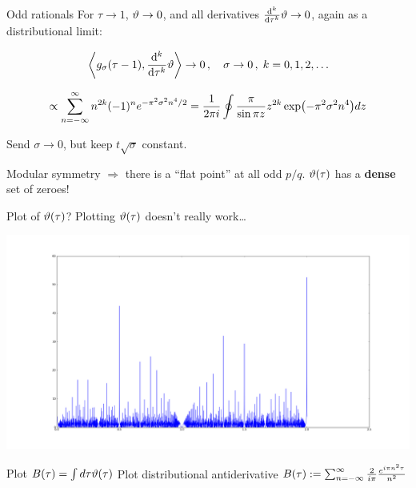 \documentclass{beamer}
\newcommand\inputpgf[2]{{
\let\pgfimageWithoutPath\pgfimage
\renewcommand{\pgfimage}[2][]{\pgfimageWithoutPath[##1]{#1/##2}}

}}
\begin{document}
\begin{frame}{Odd rationals}
    For $\tau \rightarrow 1$, $\vartheta \rightarrow 0$, and all derivatives $\dv[k]{\tau} \vartheta \rightarrow 0$, again as a distributional limit:

   
    \begin{equation}
        \left\langle g_\sigma(\tau-1), \dv[k]{\tau} \vartheta \right\rangle \rightarrow 0\,,\quad \sigma \rightarrow 0\,,\; k = 0,1,2,\ldots
        \label{}
    \end{equation}

    \vfill

   
    \[ \propto \sum_{n=-\infty}^\infty n^{2k} (-1)^n e^{-\pi^2 \sigma^2 n^4 / 2} = \frac{1}{2\pi i}\oint \frac{\pi}{\sin \pi z} z^{2k} \exp(-\pi^2\sigma^2 n^4) dz \]

    \scalebox{0.8}{} Send $\sigma \rightarrow 0$, but keep $t \sqrt{\sigma}$ constant.

\end{frame}

\begin{frame}

    Modular symmetry $\Rightarrow$ there is a ``flat point'' at all odd $p/q$. $\vartheta(\tau)$ has a \textbf{dense} set of zeroes!


\end{frame}

\begin{frame}{Plot of $\vartheta(\tau)$?}
    Plotting $\vartheta(\tau)$ doesn't really work\ldots
    
    \begin{centering}
        \includegraphics[width=1.2\textwidth]{figure_1}
    \end{centering}

\end{frame}


\begin{frame}{Plot $B(\tau) = \int d\tau \vartheta(\tau)$}
    Plot distributional antiderivative $B(\tau) := \sum_{n=-\infty}^\infty \frac{2}{i\pi} \frac{e^{i\pi n^2 \tau}}{n^2}$

    \scalebox{0.8}{\inputpgf{images}{batman.pgf}}
\end{frame}
\end{document}
